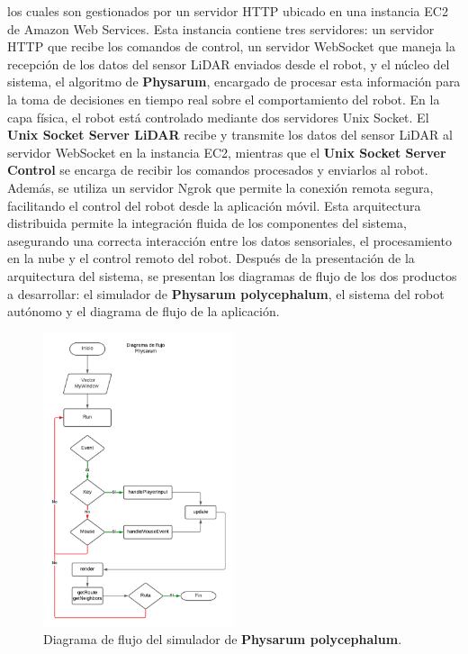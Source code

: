         los cuales son gestionados por un servidor HTTP ubicado en una instancia EC2 de Amazon Web Services. Esta instancia 
        contiene tres servidores: un servidor HTTP que recibe los comandos de control, un servidor WebSocket que maneja la 
        recepci\'on de los datos del sensor LiDAR enviados desde el robot, y el n\'ucleo del sistema, el algoritmo de \textbf{Physarum},
        encargado de procesar esta informaci\'on para la toma de decisiones en tiempo real sobre el comportamiento del robot.
        \vskip 0.5cm
        En la capa f\'isica, el robot est\'a controlado 
        mediante dos servidores Unix Socket. El \textbf{Unix Socket Server LiDAR} recibe 
        y transmite los datos del sensor LiDAR al servidor WebSocket en la instancia EC2, 
        mientras que el \textbf{Unix Socket Server Control} se encarga de recibir los comandos procesados y enviarlos al robot. 
        Adem\'as, se utiliza un servidor Ngrok que permite la conexi\'on remota segura, facilitando el control del robot desde 
        la aplicaci\'on m\'ovil.
        \vskip 0.5cm
        Esta arquitectura distribuida permite la integraci\'on fluida de los componentes del sistema, 
        asegurando una correcta interacci\'on entre los datos sensoriales, el procesamiento en la nube y el control 
        remoto del robot.
        \vskip 0.5cm
        Despu\'es de la presentaci\'on de la arquitectura del sistema, se presentan los diagramas de flujo de los dos
        productos a desarrollar: el simulador de \textbf{Physarum polycephalum}, el sistema del robot aut\'onomo y el diagrama de flujo de la aplicaci\'on.
        \vskip 0.5cm
            \begin{figure}[htbp]
                \centering
                \includegraphics[width=0.5\textwidth]{images/desarrollo/diagramas/FlujoSim.png}
                \caption{Diagrama de flujo del simulador de \textbf{Physarum polycephalum}.}
                \label{fig:FlujoSimulador}
            \end{figure}
        \vskip 0.5cm

